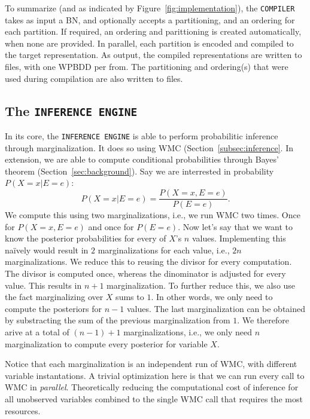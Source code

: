 To summarize (and as indicated by Figure~\ref{fig:implementation}), the \texttt{COMPILER} takes as input a BN, and optionally accepts a partitioning, and an ordering for each partition. If required, an ordering and parittioning is created automatically, when none are provided. In parallel, each partition is encoded and compiled to the target representation. As output, the compiled representations are written to files, with one WPBDD per from. The partitioning and ordering(s) that were used during compilation are also written to files.

\subsection{The \texttt{INFERENCE ENGINE}}

In its core, the \texttt{INFERENCE ENGINE} is able to perform probabilitic inference through marginalization. It does so using WMC (Section~\ref{subsec:inference}. In extension, we are able to compute conditional probabilities through Bayes' theorem (Section~\ref{sec:background}). Say we are interrested in probability $P(X = x | E = e)$:  \[P(X = x | E = e) = \frac{P(X = x, E = e)}{P(E = e)}.\]
We compute this using two marginalizations, i.e., we run WMC two times. Once for $P(X = x, E = e)$ and once for $P(E = e)$. Now let's say that we want to know the posterior probabilities for every of $X$'s $n$ values. Implementing this na\"ively would result in $2$ marginalizations for each value, i.e., $2n$ marginalizations. We reduce this to reusing the divisor for every computation. The divisor is computed once, whereas the dinominator is adjusted for every value. This results in $n + 1$ marginalization. To further reduce this, we also use the fact marginalizing over $X$ sums to $1$. In other words, we only need to compute the posteriors for $n-1$ values. The last marginalization can be obtained by substracting the sum of the previous marginalization from $1$. We therefore arive at a total of $(n-1) + 1$ marginalizations, i.e., we only need $n$ marginalization to compute every posterior for variable $X$.

Notice that each marginalization is an independent run of WMC, with different variable instantations. A trivial optimization here is that we can run every call to WMC in \emph{parallel}. Theoretically reducing the computational cost of inference for all unobserved variables combined to the single WMC call that requires the most resources.

